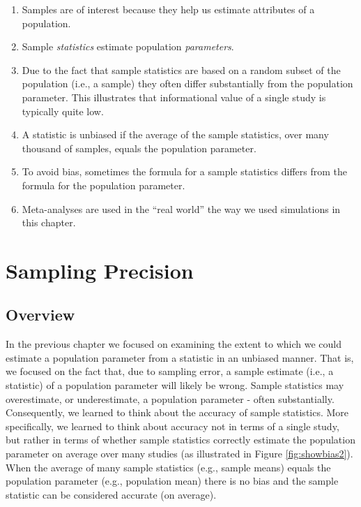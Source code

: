\documentclass[
]{krantz}
\begin{document}
\begin{enumerate}
\def\labelenumi{\arabic{enumi}.}
\item
  Samples are of interest because they help us estimate attributes of a population.
\item
  Sample \emph{statistics} estimate population \emph{parameters}.
\item
  Due to the fact that sample statistics are based on a random subset of the population (i.e., a sample) they often differ substantially from the population parameter. This illustrates that informational value of a single study is typically quite low.
\item
  A statistic is unbiased if the average of the sample statistics, over many thousand of samples, equals the population parameter.
\item
  To avoid bias, sometimes the formula for a sample statistics differs from the formula for the population parameter.
\item
  Meta-analyses are used in the ``real world'' the way we used simulations in this chapter.
\end{enumerate}

\hypertarget{sampling-precision}{%
\chapter{Sampling Precision}\label{sampling-precision}}

\hypertarget{overview}{%
\section{Overview}\label{overview}}

In the previous chapter we focused on examining the extent to which we could estimate a population parameter from a statistic in an unbiased manner. That is, we focused on the fact that, due to sampling error, a sample estimate (i.e., a statistic) of a population parameter will likely be wrong. Sample statistics may overestimate, or underestimate, a population parameter - often substantially. Consequently, we learned to think about the accuracy of sample statistics. More specifically, we learned to think about accuracy not in terms of a single study, but rather in terms of whether sample statistics correctly estimate the population parameter on average over many studies (as illustrated in Figure \ref{fig:showbias2}). When the average of many sample statistics (e.g., sample means) equals the population parameter (e.g., population mean) there is no bias and the sample statistic can be considered accurate (on average).
\end{document}
